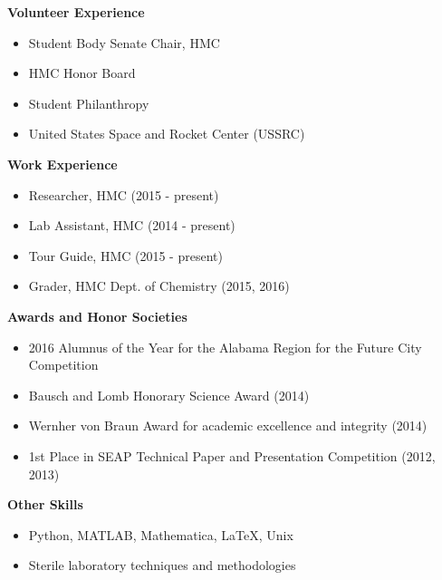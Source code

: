 \documentclass[9pt]{article}
\begin{document}
\begin{multicols*}{2}

\noindent
{\bf Volunteer Experience \\}
\vspace{-8mm}
	\begin{itemize}[leftmargin=3.75mm]
		\setlength{\itemsep}{0pt}
    	\setlength{\parskip}{0pt}
    	\setlength{\parsep}{0pt}
		\item Student Body Senate Chair, HMC
		\item HMC Honor Board
		\item Student Philanthropy
		\item United States Space and Rocket Center (USSRC)
	\end{itemize}

\noindent
{\bf Work Experience \\}
\vspace{-8mm}
	\begin{itemize}[leftmargin=3.75mm]
		\setlength{\itemsep}{0pt}
    	\setlength{\parskip}{0pt}
    	\setlength{\parsep}{0pt}
		\item Researcher, HMC (2015 - present)
		\item Lab Assistant, HMC (2014 - present)
		\item Tour Guide, HMC (2015 - present)
		\item Grader, HMC Dept. of Chemistry (2015, 2016)
	\end{itemize}

\hfill	
\columnbreak

\noindent

{\bf Awards and Honor Societies \\}
\vspace{-8mm}
	\begin{itemize}[leftmargin=3.75mm]
		\setlength{\itemsep}{0pt}
    	\setlength{\parskip}{0pt}
    	\setlength{\parsep}{0pt}
		\item 2016 Alumnus of the Year for the Alabama Region for the 			Future City Competition
		\item Bausch and Lomb Honorary Science Award (2014)
		\item Wernher von Braun Award for academic excellence and 				integrity (2014)
		\item 1st Place in SEAP Technical Paper and Presentation 				Competition (2012, 2013)
	\end{itemize}

\noindent
{\bf Other Skills \\}
\vspace{-8mm}
	\begin{itemize}[leftmargin=3.75mm]
		\setlength{\itemsep}{0pt}
    	\setlength{\parskip}{0pt}
    	\setlength{\parsep}{0pt}
		\item Python, MATLAB, Mathematica, \LaTeX, Unix
		\item Sterile laboratory techniques and methodologies
	\end{itemize}

\end{multicols*}
%
%
\end{document}

